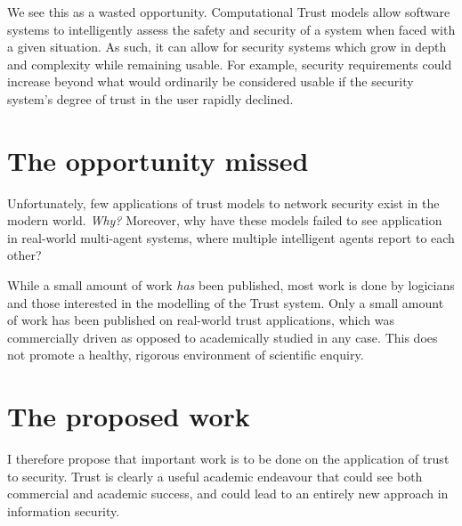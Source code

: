 \documentclass{tufte-handout}
\begin{document}
We see this as a wasted opportunity. Computational Trust models allow software systems to intelligently assess the safety and security of a system when faced with a given situation. As such, it can allow for security systems which grow in depth and complexity while remaining usable. For example, security requirements could increase beyond what would ordinarily be considered usable if the security system's degree of trust in the user rapidly declined. \par

\section{The opportunity missed}
Unfortunately, few applications of trust models to network security exist in the modern world. \emph{Why?} Moreover, why have these models failed to see application in real-world multi-agent systems, where multiple intelligent agents report to each other?\par

While a small amount of work \emph{has} been published, most work is done by logicians and those interested in the modelling of the Trust system. Only a small amount of work has been published on real-world trust applications, which was commercially driven as opposed to academically studied in any case\cite{Yan2003}. This does not promote a healthy, rigorous environment of scientific enquiry.\par

\section{The proposed work}
I therefore propose that important work is to be done on the application of trust to security. Trust is clearly a useful academic endeavour that could see both commercial and academic success, and could lead to an entirely new approach in information security.\par
\end{document}

